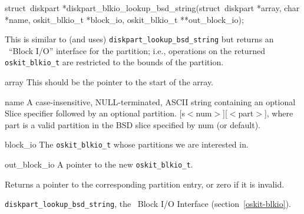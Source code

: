 \begin{apisyn}

        \funcproto struct~diskpart
		*diskpart_blkio_lookup_bsd_string(struct~diskpart *array,
			char *name, oskit_blkio_t *block_io,
			\outparam oskit_blkio_t **out_block_io);
\end{apisyn}
\begin{apidesc}
	This is similar to (and uses) \texttt{diskpart_lookup_bsd_string}
	but returns an \oskit\ ``Block I/O'' interface for the partition;
	i.e., operations on the returned \texttt{oskit_blkio_t} are restricted
	to the bounds of the partition.
\end{apidesc}
\begin{apiparm}
        \item[array]
		This should be the pointer to the start of the array.
	\item[name]
		A case-insensitive, NULL-terminated, ASCII string
		containing an optional Slice specifier followed by an
		optional partition.  [s$<$num$>$][$<$part$>$], where part is
		a valid partition in the BSD slice specified by num
		(or default).
	\item[block_io]
		The \texttt{oskit_blkio_t} whose partitions we are interested
		in.
	\item[out_block_io]
		A pointer to the new \texttt{oskit_blkio_t}.
\end{apiparm}
\begin{apiret}
        Returns a pointer to the corresponding partition entry, or
	zero if it is invalid.
\end{apiret}
\begin{apirel}
	\texttt{diskpart_lookup_bsd_string},
	the \oskit\ Block I/O Interface (section~\ref{oskit-blkio}).
\end{apirel}


